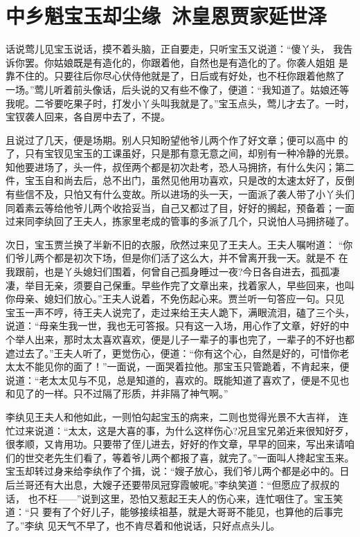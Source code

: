\chapter{中乡魁宝玉却尘缘~沐皇恩贾家延世泽}

话说莺儿见宝玉说话，摸不着头脑，正自要走，只听宝玉又说道：“傻丫头，
我告诉你罢。你姑娘既是有造化的，你跟着他，自然也是有造化的了。你袭人姐姐
是靠不住的。只要往后你尽心伏侍他就是了，日后或有好处，也不枉你跟着他熬了
一场。”莺儿听着前头像话，后头说的又有些不像了，便道：“我知道了。姑娘还等
我呢。二爷要吃果子时，打发小丫头叫我就是了。”宝玉点头，莺儿才去了。一时，
宝钗袭人回来，各自房中去了，不提。

且说过了几天，便是场期。别人只知盼望他爷儿两个作了好文章；便可以高中
的了，只有宝钗见宝玉的工课虽好，只是那有意无意之间，却别有一种冷静的光景。
知他要进场了，头一件，叔侄两个都是初次赴考，恐人马拥挤，有什么失闪；第二
件，宝玉自和尚去后，总不出门，虽然见他用功喜欢，只是改的太速太好了，反倒
有些信不及，只怕又有什么变故。所以进场的头一天，一面派了袭人带了小丫头们
同着素云等给他爷儿两个收拾妥当，自己又都过了目，好好的搁起，预备着；一面
过来同李纨回了王夫人，拣家里老成的管事的多派了几个，只说怕人马拥挤碰了。

次日，宝玉贾兰换了半新不旧的衣服，欣然过来见了王夫人。王夫人嘱咐道：
“你们爷儿两个都是初次下场，但是你们活了这么大，并不曾离开我一天。就是不
在我跟前，也是丫头媳妇们围着，何曾自己孤身睡过一夜?今日各自进去，孤孤凄
凄，举目无亲，须要自己保重。早些作完了文章出来，找着家人，早些回来，也叫
你母亲、媳妇们放心。”王夫人说着，不免伤起心来。贾兰听一句答应一句。只见
宝玉一声不哼，待王夫人说完了，走过来给王夫人跪下，满眼流泪，磕了三个头，
说道：“母亲生我一世，我也无可答报。只有这一入场，用心作了文章，好好的中
个举人出来，那时太太喜欢喜欢，便是儿子一辈子的事也完了，一辈子的不好也都
遮过去了。”王夫人听了，更觉伤心，便道：“你有这个心，自然是好的，可惜你老
太太不能见你的面了！”一面说，一面哭着拉他。那宝玉只管跪着，不肯起来，便
说道：“老太太见与不见，总是知道的，喜欢的。既能知道了喜欢了，便是不见也
和见了的一样。只不过隔了形质，并非隔了神气啊。”

李纨见王夫人和他如此，一则怕勾起宝玉的病来，二则也觉得光景不大吉祥，
连忙过来说道：“太太，这是大喜的事，为什么这样伤心?况且宝兄弟近来很知好歹，
很孝顺，又肯用功。只要带了侄儿进去，好好的作文章，早早的回来，写出来请咱
们的世交老先生们看了，等着爷儿两个都报了喜，就完了。”一面叫人搀起宝玉来。
宝玉却转过身来给李纨作了个揖，说：“嫂子放心，我们爷儿两个都是必中的。日
后兰哥还有大出息，大嫂子还要带凤冠穿霞帔呢。”李纨笑道：“但愿应了叔叔的话，
也不枉——”说到这里，恐怕又惹起王夫人的伤心来，连忙咽住了。宝玉笑道：“只
要有了个好儿子，能够接续祖基，就是大哥哥不能见，也算他的后事完了。”李纨
见天气不早了，也不肯尽着和他说话，只好点点头儿。

